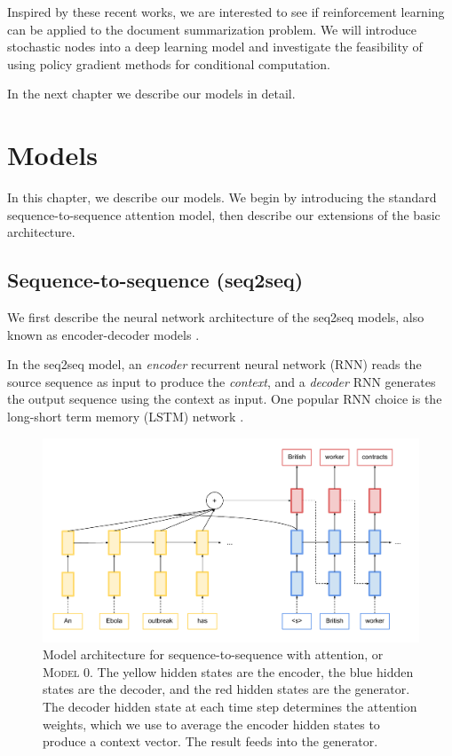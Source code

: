 \documentclass[12pt]{report}
\begin{document}
Inspired by these recent works, we are interested to see if reinforcement learning can be applied to the document summarization problem. We will introduce stochastic nodes into a deep learning model and investigate the feasibility of using policy gradient methods for conditional computation.

In the next chapter we describe our models in detail.


\chapter{Models}
\label{chap:models}

In this chapter, we describe our models. We begin by introducing the standard sequence-to-sequence attention model, then describe our extensions of the basic architecture.

\section{Sequence-to-sequence (seq2seq)}

We first describe the neural network architecture of the seq2seq models, also known as encoder-decoder models \citep{bahdanau2014neural}.


In the seq2seq model, an \emph{encoder} recurrent neural network (RNN) reads the source sequence as input to produce the \emph{context}, and a \emph{decoder} RNN generates the output sequence using the context as input.  One popular RNN choice is the long-short term memory (LSTM) network \citep{hochreiter1997long}.

\begin{figure}[t]
\includegraphics[width=\textwidth]{images/seq2seq}
\caption[Sequence-to-Sequence Model]{Model architecture for sequence-to-sequence with attention, or \textsc{Model 0}. The yellow hidden states are the encoder, the blue hidden states are the decoder, and the red hidden states are the generator. The decoder hidden state at each time step determines the attention weights, which we use to average the encoder hidden states to produce a context vector. The result feeds into the generator.}
\label{fig:seq2seq}
\end{figure}
\end{document}
